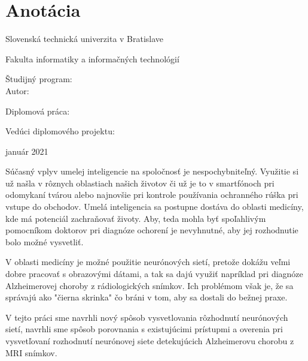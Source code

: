 
\thispagestyle{empty}
\section*{Anotácia}

\begin{minipage}[t]{1\columnwidth}%
Slovenská technická univerzita v Bratislave

Fakulta informatiky a informačných technológií

Študijný program: \myStudyProgram\\

Autor: \myName

Diplomová práca: \myTitle

Vedúci diplomového projektu: \mySupervisor

január 2021
\end{minipage}

\bigskip{}

Súčasný vplyv umelej inteligencie na spoločnosť je nespochybniteľný. Využitie si už našla v rôznych oblastiach našich životov či už je to v smartfónoch pri odomykaní tvárou alebo najnovšie pri kontrole používania ochranného rúška pri vstupe do obchodov. Umelá inteligencia sa postupne dostáva do oblasti medicíny, kde má potenciál zachraňovať životy. Aby, teda mohla byť spoľahlivým pomocníkom doktorov pri diagnóze ochorení je nevyhnutné, aby jej rozhodnutie bolo možné vysvetliť. 

V oblasti medicíny je možné použitie neurónových sietí, pretože dokážu veľmi dobre pracovať s obrazovými dátami, a tak sa dajú využiť napríklad pri diagnóze Alzheimerovej choroby z rádiologických snímkov. Ich problémom však je, že sa správajú ako "čierna skrinka" čo bráni v tom, aby sa dostali do bežnej praxe.

V tejto práci sme navrhli nový spôsob vysvetlovania rôzhodnutí neurónových sietí, navrhli sme spôsob porovnania s existujúcimi prístupmi a overenia pri vysvetľovaní rozhodnutí neurónovej siete detekujúcich Alzheimerovu chorobu z MRI snímkov.

\newpage
\thispagestyle{empty}
\mbox{}
\newpage
